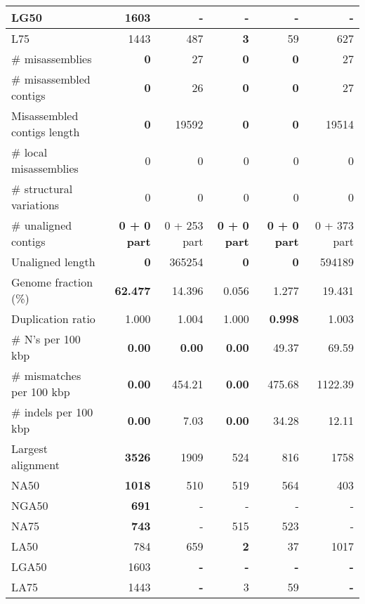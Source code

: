 \documentclass[12pt,a4paper]{article}
\begin{document}
\begin{table}[ht]
\begin{center}
\begin{tabular}{|l*{5}{|r}|}
LG50 & 1603 & {\bf -} & {\bf -} & {\bf -} & {\bf -} \\ \hline
L75 & 1443 & 487 & {\bf 3} & 59 & 627 \\ \hline
\# misassemblies & {\bf 0} & 27 & {\bf 0} & {\bf 0} & 27 \\ \hline
\# misassembled contigs & {\bf 0} & 26 & {\bf 0} & {\bf 0} & 27 \\ \hline
Misassembled contigs length & {\bf 0} & 19592 & {\bf 0} & {\bf 0} & 19514 \\ \hline
\# local misassemblies & 0 & 0 & 0 & 0 & 0 \\ \hline
\# structural variations & 0 & 0 & 0 & 0 & 0 \\ \hline
\# unaligned contigs & {\bf 0 + 0 part} & 0 + 253 part & {\bf 0 + 0 part} & {\bf 0 + 0 part} & 0 + 373 part \\ \hline
Unaligned length & {\bf 0} & 365254 & {\bf 0} & {\bf 0} & 594189 \\ \hline
Genome fraction (\%) & {\bf 62.477} & 14.396 & 0.056 & 1.277 & 19.431 \\ \hline
Duplication ratio & 1.000 & 1.004 & 1.000 & {\bf 0.998} & 1.003 \\ \hline
\# N's per 100 kbp & {\bf 0.00} & {\bf 0.00} & {\bf 0.00} & 49.37 & 69.59 \\ \hline
\# mismatches per 100 kbp & {\bf 0.00} & 454.21 & {\bf 0.00} & 475.68 & 1122.39 \\ \hline
\# indels per 100 kbp & {\bf 0.00} & 7.03 & {\bf 0.00} & 34.28 & 12.11 \\ \hline
Largest alignment & {\bf 3526} & 1909 & 524 & 816 & 1758 \\ \hline
NA50 & {\bf 1018} & 510 & 519 & 564 & 403 \\ \hline
NGA50 & {\bf 691} & - & - & - & - \\ \hline
NA75 & {\bf 743} & - & 515 & 523 & - \\ \hline
LA50 & 784 & 659 & {\bf 2} & 37 & 1017 \\ \hline
LGA50 & 1603 & {\bf -} & {\bf -} & {\bf -} & {\bf -} \\ \hline
LA75 & 1443 & {\bf -} & 3 & 59 & {\bf -} \\ \hline
\end{tabular}
\end{center}
\end{table}
\end{document}
